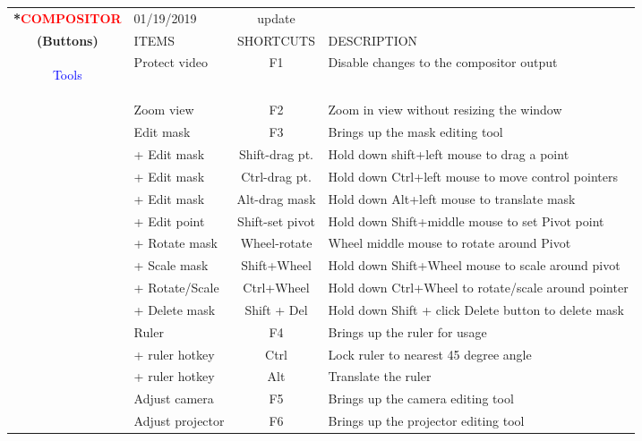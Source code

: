 \begin{center}
    \small 
    \begin{longtable}{ >{\bfseries}c l c p{6cm}}             
        \toprule
        \multirow{2}*{\textcolor{red}{COMPOSITOR}} & 01/19/2019 & update & \\
        \noalign{\smallskip}
        \cline{2-4}
        \noalign{\smallskip}
        (Buttons) & ITEMS & SHORTCUTS & DESCRIPTION\\        
        \midrule
        \endhead   
                      
        \textcolor{blue}{Tools} & Protect video & F1 & Disable changes to the compositor output \\        
        & Zoom view & F2 & Zoom in view without resizing the window \\        
        & Edit mask & F3 & Brings up the mask editing tool \\        
        & + Edit mask & Shift-drag pt. & Hold down shift+left mouse to drag a point \\        
        & + Edit mask & Ctrl-drag pt. & Hold down Ctrl+left mouse to move control pointers \\        
        & + Edit mask & Alt-drag mask & Hold down Alt+left mouse to translate mask \\                
        & + Edit point & Shift-set pivot & Hold down Shift+middle mouse to set Pivot point \\              
        & + Rotate mask & Wheel-rotate & Wheel middle mouse to rotate around Pivot \\                
        & + Scale mask & Shift+Wheel & Hold down Shift+Wheel mouse to scale around pivot \\                
        & + Rotate/Scale & Ctrl+Wheel & Hold down Ctrl+Wheel to rotate/scale around pointer\\              
        & + Delete mask & Shift + Del & Hold down Shift + click Delete button to delete mask \\        
        & Ruler & F4 & Brings up the ruler for usage \\        
        & + ruler hotkey & Ctrl & Lock ruler to nearest 45 degree angle \\        
        & + ruler hotkey & Alt & Translate the ruler \\        
        & Adjust camera & F5 & Brings up the camera editing tool \\        
        & Adjust projector & F6 & Brings up the projector editing tool \\        

\end{longtable}
\end{center}
